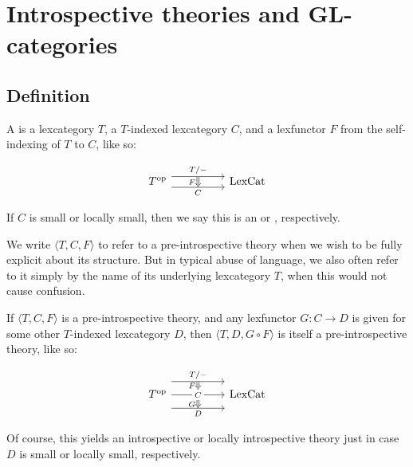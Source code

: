 \section{Introspective theories and GL-categories}

\subsection{Definition}
\begin{definition} \label{IntrospectiveTheory}
A  is a lexcategory $T$, a $T$-indexed lexcategory $C$, and a lexfunctor $F$ from the self-indexing of $T$ to $C$, like so:

\[\begin{tikzcd}
	{\op{T}} && {\LexCat}
	\arrow["{T/-}"{name=0}, from=1-1, to=1-3, shift left=2]
	\arrow["{C}"{name=1, swap}, from=1-1, to=1-3, shift right=2]
	\arrow[Rightarrow, "{F}"', from=0, to=1]
\end{tikzcd}\]

If $C$ is small or locally small, then we say this is an  or , respectively.
\end{definition}

We write $\langle T, C, F \rangle$ to refer to a pre-introspective theory when we wish to be fully explicit about its structure. But in typical abuse of language, we also often refer to it simply by the name of its underlying lexcategory $T$, when this would not cause confusion.

\begin{construction}
If $\langle T, C, F \rangle$ is a pre-introspective theory, and any lexfunctor $G : C \to D$ is given for some other $T$-indexed lexcategory $D$, then $\langle T, D, G \circ F \rangle$ is itself a pre-introspective theory, like so: 

\[\begin{tikzcd}
	{\op{T}} && {\LexCat}
	\arrow["{T/-}"{name=0}, from=1-1, to=1-3, shift left=5]
	\arrow["{C}"{name=1, description}, from=1-1, to=1-3]
	\arrow["{D}"{name=2, swap}, from=1-1, to=1-3, shift right=5]
	\arrow[Rightarrow, "{F}"', from=0, to=1]
	\arrow[Rightarrow, "{G}"', from=1, to=2]
\end{tikzcd}\]

Of course, this yields an introspective or locally introspective theory just in case $D$ is small or locally small, respectively.
\end{construction}

